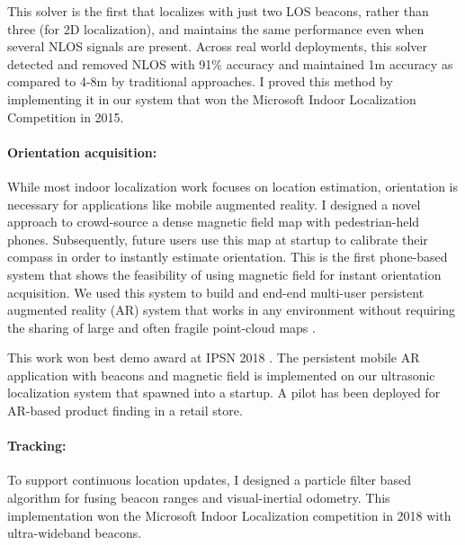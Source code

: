 \documentclass[10pt]{article}
\begin{document}
This solver is the first that localizes with just two LOS beacons, rather than three (for 2D localization), and maintains the same performance even when several NLOS signals are present. Across real
world deployments, this solver detected and removed NLOS with 91\% accuracy and maintained 1m accuracy as compared to 4-8m by traditional approaches. I proved this method by implementing it in our system that won the Microsoft Indoor Localization Competition in 2015. 

\paragraph{Orientation acquisition: }
While most indoor localization work focuses on location
estimation, orientation is necessary for applications like mobile
augmented reality. %
I designed a novel approach to crowd-source a dense magnetic field
map with pedestrian-held phones. Subsequently, future users use this map at startup to calibrate
their compass in order to instantly estimate orientation. %
This is the first phone-based system that shows the feasibility of using magnetic field for instant orientation acquisition. %
We used
this system to build and end-end multi-user persistent augmented
reality (AR) system that works in any environment without requiring the
sharing of large and often fragile point-cloud maps \cite{mobileAR}. 

This work won best demo award at IPSN 2018 \cite{rajagopal2018welcome}. The persistent mobile AR application with beacons and magnetic field is implemented on our ultrasonic localization system that spawned into a startup. A pilot has been deployed for AR-based product finding in a retail store. 

\paragraph{Tracking:} To support continuous location updates, I designed a particle filter based algorithm for fusing beacon ranges and visual-inertial odometry. This implementation won the Microsoft Indoor Localization competition in 2018 with ultra-wideband beacons.
\end{document}
